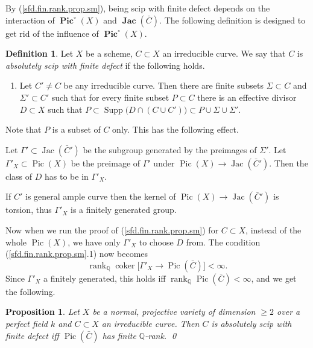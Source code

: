 \documentclass{amsart}
\newtheorem{prop}[thm]{Proposition}
\theoremstyle{definition}
\newtheorem{defn}[thm]{Definition}
\theoremstyle{remark}
\newcommand{\q}[0]{{\mathbb Q}}
\newcommand{\pic}[0]{\operatorname{Pic}}
\newcommand{\pico}[0]{\operatorname{\mathbf{Pic}}^{\circ}}
\newcommand{\qrank}[0]{\operatorname{rank}_{\q}}
\newcommand{\supp}[0]{\operatorname{Supp}}
\newcommand{\coker}[0]{\operatorname{coker}}
\newcommand{\jacs}[0]{\operatorname{\mathbf{Jac}}}
\newcommand{\jac}[0]{\operatorname{Jac}}
\begin{document}
\medskip

By (\ref{sfd.fin.rank.prop.sm}), being  scip  with finite  defect depends on the interaction of $\pico(X)$ and   $\jacs(\bar C)$. The following definition is designed to get rid of the influence of $\pico(X)$. 









\begin{defn}\label{ci.defn.3.abs} Let $X$ be a scheme,  $C\subset X$ an  irreducible curve.  We say that $C$ is  {\it absolutely scip  with finite defect} if
 the following holds.
\begin{enumerate}
\item  Let  $C'\neq C$  be any irreducible  curve. Then there  are finite subsets $\Sigma\subset C$ and $\Sigma'\subset  C'$ such that 
for every  finite subset $P\subset C$ there is an effective divisor $D\subset X$ 
such that $P\subset \supp\bigl(D\cap (C\cup C')\bigr)\subset P\cup \Sigma\cup \Sigma'$.

\end{enumerate}
 \end{defn}


Note that $P$ is a subset of $C$ only.
This has the following effect.

Let $\Gamma'\subset \jac(\bar C')$ be the subgroup generated by the 
preimages of $\Sigma'$. Let $\Gamma'_X\subset \pic(X)$
be the  preimage of $\Gamma'$ under $\pic(X)\to \jac(\bar C')$. 
Then the class of $D$ has to be in $\Gamma'_X$.

If $C'$ is general ample curve then the kernel of $\pic(X)\to \jac(\bar C')$
is torsion, thus  $\Gamma'_X$ is a finitely generated group. 

Now when we run the proof of (\ref{sfd.fin.rank.prop.sm})
for $C\subset X$, instead of the whole $\pic(X)$, we have only
$\Gamma'_X$ to choose $D$ from. 
The condition (\ref{sfd.fin.rank.prop.sm}.1) now becomes
$$
\qrank\coker\bigl[\Gamma'_X\to \pic(\bar C)\bigr]<\infty.
$$
Since $\Gamma'_X$  a finitely generated, this holds iff
$\qrank \pic(\bar C)<\infty$,
and we get the following.

\begin{prop}\label{sfgd.fin.rank.prop.rel}
  Let $X$ be a normal, projective variety of dimension $\geq 2$ over a perfect field $k$ and $C\subset X$ an irreducible   curve. 
Then $C$ is absolutely  scip  with finite  defect iff
$\pic(\bar C)$ has finite $\q$-rank. \qed
\end{prop}
\end{document}
